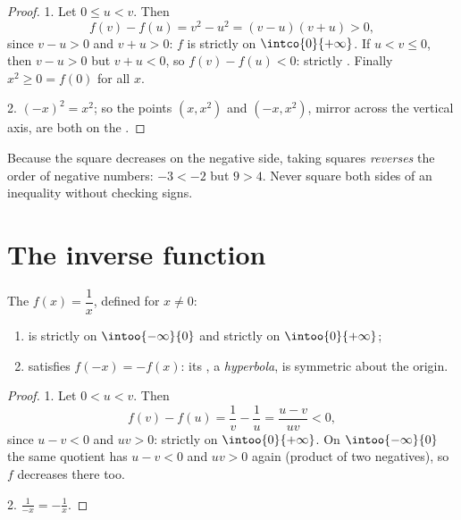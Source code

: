 \begin{proof}
1. Let $0 \leq u < v$. Then
\[
f(v) - f(u) = v^2 - u^2 = (v - u)(v + u) > 0,
\]
since $v - u > 0$ and $v + u > 0$: $f$ is strictly  on
$\intco{0}{+\infty}$. If $u < v \leq 0$, then $v - u > 0$ but
$v + u < 0$, so $f(v) - f(u) < 0$: strictly . Finally
$x^2 \geq 0 = f(0)$ for all $x$.

2. $(-x)^2 = x^2$; so the points $(x, x^2)$ and $(-x, x^2)$, mirror 
across the vertical axis, are both on the .
\end{proof}

\begin{remark}
Because the square  decreases on the negative side, taking squares
\emph{reverses} the order of negative numbers: $-3 < -2$ but $9 > 4$.
Never square both sides of an inequality without checking signs.
\end{remark}

\section{The inverse function}

\begin{proposition}\label{prop:g10:reffunc:inverse}
The  $f(x) = \dfrac1x$, defined for $x \neq 0$:
\begin{enumerate}
  \item is strictly  on $\intoo{-\infty}{0}$ and strictly
         on $\intoo{0}{+\infty}$;
  \item satisfies $f(-x) = -f(x)$: its , a
        \emph{hyperbola}, is symmetric about the origin.
\end{enumerate}
\end{proposition}

\begin{proof}
1. Let $0 < u < v$. Then
\[
f(v) - f(u) = \frac1v - \frac1u = \frac{u - v}{uv} < 0,
\]
since $u - v < 0$ and $uv > 0$: strictly  on
$\intoo{0}{+\infty}$. On $\intoo{-\infty}{0}$ the same quotient has
$u - v < 0$ and $uv > 0$ again (product of two negatives), so $f$
decreases there too.

2. $\frac{1}{-x} = -\frac1x$.
\end{proof}

